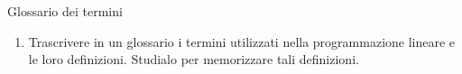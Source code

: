 \documentclass{beamer}
\begin{document}
\generatitolo

\begin{frame}{Glossario dei termini}
    \begin{enumerate}    
     \item Trascrivere in un glossario i termini utilizzati nella
     programmazione lineare e le loro definizioni. Studialo per
     memorizzare tali definizioni.
     
    \end{enumerate}
\end{frame}
\end{document}

